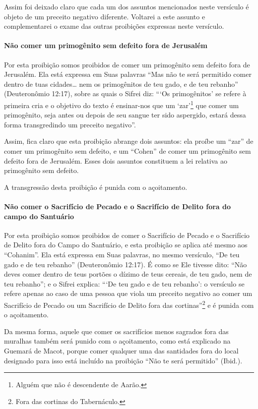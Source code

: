 Assim foi deixado claro que cada um dos assuntos mencionados neste
versículo é objeto de um preceito negativo diferente. Voltarei a este
assunto e complementarei o exame das outras proibições expressas neste
versículo.

\paragraph{Não comer um primogênito sem defeito fora de Jerusalém}

Por esta proibição somos proibidos de comer um primogênito sem defeito
fora de Jerusalém. Ela está expressa em Suas palavras ``Mas não te será
permitido comer dentro de tuas cidades\ldots{} nem os primogênitos de teu
gado, e de teu rebanho'' (Deuteronômio 12:17), sobre as quais o Sifrei
diz: ```Os primogênitos' se refere à primeira cria e o objetivo do
texto é ensinar-nos que um `zar'\footnote{Alguém que não é descendente de Aarão.} que comer um primogênito, seja antes ou depois de seu sangue ter sido aspergido,
estará dessa forma transgredindo um preceito negativo''.

Assim, fica claro que esta proibição abrange dois assuntos: ela proíbe
um ``zar'' de comer um primogênito sem defeito, e um ``Cohen'' de comer
um primogênito sem defeito fora de Jerusalém. Esses dois assuntos
constituem a lei relativa ao primogênito sem defeito.

A transgressão desta proibição é punida com o açoitamento.

\paragraph{Não comer o Sacrifício de Pecado e o Sacrifício de Delito fora do campo do
Santuário}

Por esta proibição somos proibidos de comer o Sacrifício de Pecado e o
Sacrifício de Delito fora do Campo do Santuário, e esta proibição se
aplica até mesmo aos ``Cohanim''. Ela está expressa em Suas palavras, no
mesmo versículo, ``De teu gado e de teu rebanho'' (Deuteronômio 12:17).
É como se Ele
tivesse dito: ``Não deves comer dentro de teus portões o dízimo de teus
cereais, de teu gado, nem de teu rebanho''; e o Sifrei explica: ```De
teu gado e de teu rebanho': o versículo se refere apenas ao caso de uma
pessoa que viola um preceito negativo ao comer um Sacrifício de Pecado
ou um Sacrifício de Delito fora das cortinas''\footnote{Fora das cortinas do Tabernáculo.} e é
punida com o açoitamento.

Da mesma forma, aquele que comer os sacrifícios menos sagrados fora das
muralhas também será punido com o açoitamento, como está explicado na
Guemará de Macot, porque comer qualquer uma das santidades fora do local
designado para isso está incluído na proibição ``Não te será permitido''
(Ibid.).

